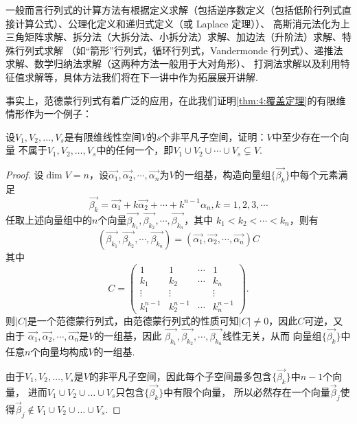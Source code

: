 一般而言行列式的计算方法有根据定义求解（包括逆序数定义（包括低阶行列式直接计算公式）、公理化定义和递归式定义（或 Laplace 定理））、
高斯消元法化为上三角矩阵求解、拆分法（大拆分法、小拆分法）求解、加边法（升阶法）求解、特殊行列式求解
（如``箭形''行列式，循环行列式，Vandermonde 行列式）、递推法求解、数学归纳法求解（这两种方法一般用于大对角形）、
打洞法求解以及利用特征值求解等，具体方法我们将在下一讲中作为拓展展开讲解.

事实上，范德蒙行列式有着广泛的应用，在此我们证明\autoref{thm:4:覆盖定理}的有限维情形作为一个例子：
\begin{example}\label{ex:11:行列式证明覆盖定理}
    设$V_1,V_2,\ldots,V_s$是有限维线性空间$V$的$s$个非平凡子空间，证明：$V$中至少存在一个向量
    不属于$V_1,V_2,\ldots,V_s$中的任何一个，即$V_1 \cup V_2 \cup \cdots \cup V_s\subsetneq V.$
\end{example}
\begin{proof}
    设$\dim V=n$，设$\vec{\alpha_1},\vec{\alpha_2},\cdots,\vec{\alpha_n}$为$V$的一组基，构造向量组$\{\vec{\beta_k}\}$中每个元素满足
    \[\vec{\beta_k}=\vec{\alpha_1}+k\vec{\alpha_2}+\cdots+k^{n-1}\alpha_n,k=1,2,3,\cdots\]
    任取上述向量组中的$n$个向量$\vec{\beta_{k_1}},\vec{\beta_{k_2}},\cdots,\vec{\beta_{k_n}}$，其中
    $k_1<k_2<\cdots<k_n$，则有
    \[(\vec{\beta_{k_1}},\vec{\beta_{k_2}},\cdots,\vec{\beta_{k_n}})=(\vec{\alpha_1},\vec{\alpha_2},\cdots,\vec{\alpha_n})C\]
    其中
    \[C=\begin{pmatrix}
        1 & 1 & \cdots & 1 \\
        k_1 & k_2 & \cdots & k_n \\
        \vdots & \vdots &  & \vdots \\
        k_1^{n-1} & k_2^{n-1} & \cdots & k_n^{n-1}
    \end{pmatrix}.\]
    则$|C|$是一个范德蒙行列式，由范德蒙行列式的性质可知$|C| \neq 0$，因此$C$可逆，又由于
    $\vec{\alpha_1},\vec{\alpha_2},\cdots,\vec{\alpha_n}$是$V$的一组基，因此
    $\vec{\beta_{k_1}},\vec{\beta_{k_2}},\cdots,\vec{\beta_{k_n}}$线性无关，从而
    向量组$\{\vec{\beta_k}\}$中任意$n$个向量均构成$V$的一组基.

    由于$V_1,V_2,\ldots,V_s$是$V$的非平凡子空间，因此每个子空间最多包含$\{\vec{\beta_k}\}$中$n-1$个向量，
    进而$V_1\cup V_2\cup\ldots\cup V_s$只包含$\{\vec{\beta_k}\}$中有限个向量，
    所以必然存在一个向量$\vec{\beta}_j$使得$\vec{\beta}_j \notin V_1\cup V_2\cup\ldots\cup V_s$.
\end{proof}

